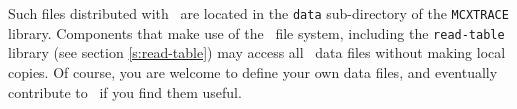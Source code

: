 Such files distributed with \MCX\ are located in the
\verb+data+ sub-directory of the \verb+MCXTRACE+ library.
Components that make use of the \MCX\ file system,
including the \verb+read-table+ library (see section \ref{s:read-table})
may access all \MCX\ data files without making local copies.
Of course, you are welcome to define your own data files,
and eventually contribute to \MCX\ if you find them useful.

%
%
